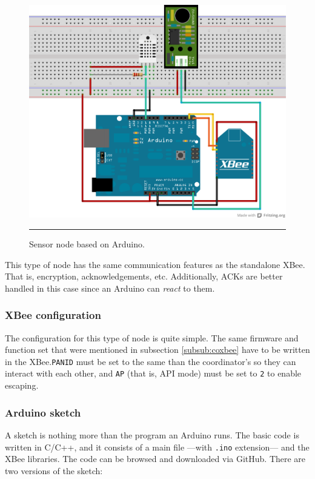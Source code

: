 \begin{figure}[htbp]
    \centering
        \includegraphics[scale=0.8]{./Figures/completesensornode.png}
        \rule{35em}{0.5pt}
    \caption[Arduino-based node schematic]{Sensor node based on Arduino.}
    \label{fig:ArduinoNode}
\end{figure}

This type of node has the same communication features as the standalone XBee. That is, encryption, acknowledgements, etc. Additionally, ACKs are better handled in this case since an Arduino can \emph{react} to them.

\subsubsection{XBee\textregistered{} configuration}
\label{sub:xbeearduino}

The configuration for this type of node is quite simple. The same firmware and function set that were mentioned in subsection \ref{subsub:coxbee} have to be written in the XBee\textregistered{}.\texttt{PANID} must be set to the same than the coordinator's so they can interact with each other, and \texttt{AP} (that is, API mode) must be set to \texttt{2} to enable escaping.

\subsubsection{Arduino sketch}
\label{subsub:arduinosketch}
A sketch is nothing more than the program an Arduino runs. The basic code is written in C/C++, and it consists of a main file ---with \texttt{.ino} extension--- and the XBee\textregistered{} libraries. The code can be browsed and downloaded via GitHub. There are two versions of the sketch:

